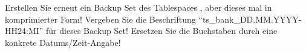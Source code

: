     \item Erstellen Sie erneut ein Backup Set des Tablespaces ,
    aber dieses mal in komprimierter Form! Vergeben Sie die Beschriftung
    \enquote{ts\_bank\_DD.MM.YYYY-HH24:MI} f\"ur dieses Backup Set! Ersetzen Sie
    die Buchstaben durch eine konkrete Datums/Zeit-Angabe!
